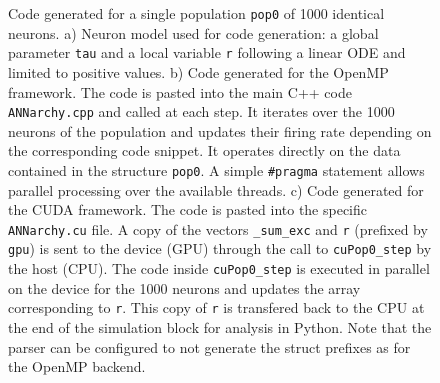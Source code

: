 \documentclass[
  11pt,
  a4paper,
]{scrbook}
\begin{document}
\begin{figure}


\caption{\label{fig-fini:generatedcode}Code generated for a single
population \texttt{pop0} of 1000 identical neurons. a) Neuron model used
for code generation: a global parameter \texttt{tau} and a local
variable \texttt{r} following a linear ODE and limited to positive
values. b) Code generated for the OpenMP framework. The code is pasted
into the main C++ code \texttt{ANNarchy.cpp} and called at each step. It
iterates over the 1000 neurons of the population and updates their
firing rate depending on the corresponding code snippet. It operates
directly on the data contained in the structure \texttt{pop0}. A simple
\texttt{\#pragma} statement allows parallel processing over the
available threads. c) Code generated for the CUDA framework. The code is
pasted into the specific \texttt{ANNarchy.cu} file. A copy of the
vectors \texttt{\_sum\_exc} and \texttt{r} (prefixed by \texttt{gpu}) is
sent to the device (GPU) through the call to \texttt{cuPop0\_step} by
the host (CPU). The code inside \texttt{cuPop0\_step} is executed in
parallel on the device for the 1000 neurons and updates the array
corresponding to \texttt{r}. This copy of \texttt{r} is transfered back
to the CPU at the end of the simulation block for analysis in Python.
Note that the parser can be configured to not generate the struct
prefixes as for the OpenMP backend.}

\end{figure}%
\end{document}
